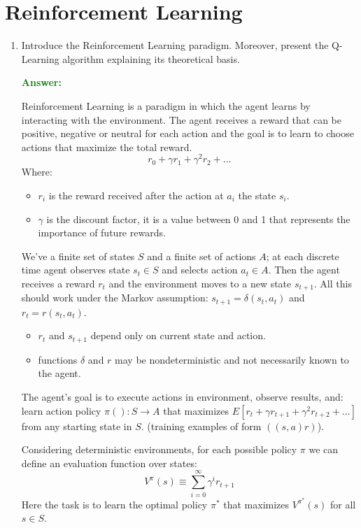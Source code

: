 \documentclass[12pt]{article}
\begin{document}
\begin{enumerate}[label=\textbf{ML.\arabic*}]
\end{enumerate}
\section{Reinforcement Learning}
\begin{enumerate}[label=\textbf{RL.\arabic*}]
    \item Introduce the Reinforcement Learning paradigm.
    Moreover, present the Q-Learning algorithm explaining its theoretical basis.

    \textcolor{green}{\textbf{Answer:}}

    Reinforcement Learning is a paradigm in which the agent learns by interacting with the environment.
    The agent receives a reward that can be positive, negative or neutral for each action and the goal is to learn to choose actions
    that maximize the total reward.
    \begin{equation}
        r_0+\gamma r_1+\gamma^2 r_2+\ldots 
    \end{equation}
    Where:
    \begin{itemize}
        \item $r_i$ is the reward received after the action at $a_i$ the state $s_i$.
        \item $\gamma$ is the discount factor, it is a value between 0 and 1 that represents the importance of future rewards.
    \end{itemize}
    We've a finite set of states $S$ and a finite set of actions $A$; at each discrete time agent observes state $s_t\in S$ and selects action $a_t\in A$.
    Then the agent receives a reward $r_t$ and the environment moves to a new state $s_{t+1}$.
    All this should work under the Markov assumption: $s_{t+1} = \delta(s_t,a_t)$ and $r_t = r(s_t,a_t)$.
    \begin{itemize}
        \item $r_t$ and $s_{t+1}$ depend only on current state and action.
        \item functions $\delta$ and $r$ may be nondeterministic and not necessarily known to the agent.
    \end{itemize}
    The agent's goal is to execute actions in environment, observe results, and: 
    learn action policy $\pi():S\rightarrow A$ that maximizes $E[r_t+\gamma r_{t+1}+\gamma^2 r_{t+2}+\ldots]$ from any starting state in $S$.
    (training examples of form $((s,a)r)$).

    Considering deterministic environments, for each possible policy $\pi$ we can define an evaluation function over states: 
    \begin{equation}
        V^\pi(s) \equiv \sum_{i=0}^{\infty}\gamma^i r_{t+1}
    \end{equation}
    Here the task is to learn the optimal policy $\pi^*$ that maximizes $V^{\pi^*}(s)$ for all $s\in S$.


\end{enumerate}
\end{document}
